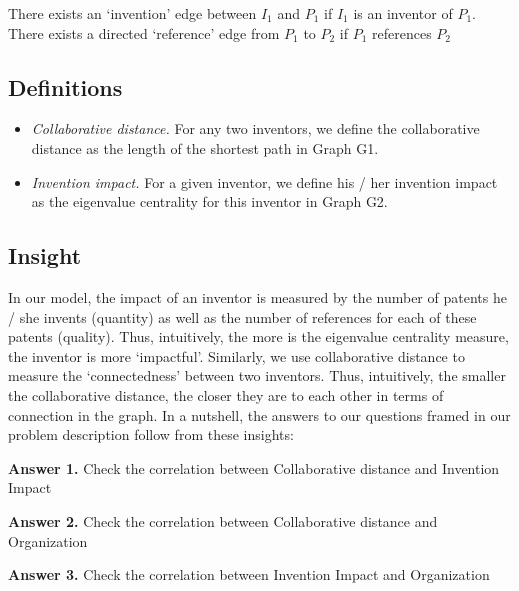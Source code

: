 \documentclass[11pt]{article}
\renewcommand{\paragraph}{\vspace{3pt}\noindent\textbf}
\newcommand{\squish}{
  \setlength{\topsep}{0pt}
  \setlength{\itemsep}{0ex}
  \setlength{\parskip}{0pt}
}
\begin{document}
There exists an `invention’ edge between $I_1$ and $P_1$ if $I_1$ is an inventor of $P_1$.
There exists a directed `reference’ edge from $P_1$ to $P_2$ if $P_1$ references $P_2$

\subsection{Definitions}
\begin{itemize}
\item {\em Collaborative distance.} For any two inventors, we define the collaborative distance as the length of the shortest path in Graph G1. 
\item {\em Invention impact.} For a given inventor, we define his / her invention impact as the eigenvalue centrality for this inventor in Graph G2. 
\end{itemize}

\subsection{Insight}
In our model, the impact of an inventor is measured by the number of patents he / she invents (quantity) as well as the number of references for each of these patents (quality). Thus, intuitively, the more is the eigenvalue centrality measure, the inventor is more ‘impactful’. Similarly, we use collaborative distance to measure the ‘connectedness’ between two inventors. Thus, intuitively, the smaller the collaborative distance, the closer they are to each other in terms of connection in the graph. 
In a nutshell, the answers to our questions framed in our problem description follow from these insights:

\paragraph{Answer 1.} Check the correlation between Collaborative distance and Invention Impact 

\paragraph{Answer 2.} Check the correlation between Collaborative distance and Organization

\paragraph{Answer 3.} Check the correlation between Invention Impact and Organization
\end{document}
